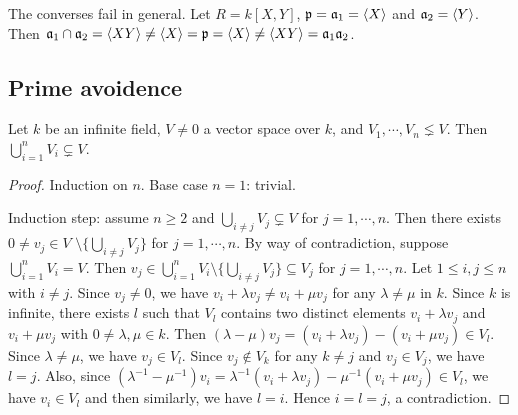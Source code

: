 \begin{example*}
    The converses fail in general. Let $R = k[X,Y]$, $\mathfrak{p} = \mathfrak{a}_1 = \langle X \rangle$ and $\mathfrak{a}_2 = \langle Y \rangle$. Then $\mathfrak{a}_1 \cap \mathfrak{a}_2 = \langle XY \rangle \neq \langle X \rangle = \mathfrak{p} = \langle X \rangle \neq  \langle XY \rangle = \mathfrak{a}_1\mathfrak{a}_2$.
\end{example*}

\subsection*{Prime avoidence}

\begin{lemma}
    Let $k$ be an infinite field, $V \neq 0$ a vector space over $k$, and $V_1,\cdots,V_n \lneq V$. Then $\bigcup_{i=1}^n V_i \subsetneq V$.
\end{lemma}

\begin{proof}
    Induction on $n$. Base case $n = 1$: trivial. \par
    Induction step: assume $n \geq 2$ and $\bigcup_{i \neq j}V_j \subsetneq V$ for $j = 1,\cdots,n$. Then there exists $0 \neq v_j \in V$ $\setminus \{\bigcup_{i \neq j}V_j\}$ for $j = 1,\cdots,n$. By way of contradiction, suppose $\bigcup_{i=1}^nV_i = V$. Then $v_j \in \bigcup_{i=1}^n V_i \setminus \{\bigcup_{i \neq j}V_j\} \subseteq V_j$ for $j = 1,\cdots,n$. Let $1 \leq i,j \leq n$ with $i \neq j$. Since $v_j \neq 0$, we have $v_i + \lambda v_j \neq v_i + \mu v_j$ for any $\lambda \neq \mu$ in $k$. Since $k$ is infinite, there exists $l$ such that $V_l$ contains two distinct elements $v_i + \lambda v_j$ and $v_i + \mu v_j$ with $0 \neq \lambda, \mu \in k$. Then $(\lambda-\mu)v_j = (v_i + \lambda v_j) - (v_i + \mu v_j) \in V_l$. Since $\lambda \neq \mu$, we have $v_j \in V_l$. Since $v_j \not \in V_k$ for any $k \neq j$ and $v_j \in V_j$, we have $l = j$. Also, since $(\lambda^{-1}-\mu^{-1})v_i = \lambda^{-1}(v_i + \lambda v_j) - \mu^{-1}(v_i + \mu v_j) \in V_l$, we have $v_i \in V_l$ and then similarly, we have $l=i$. Hence $i = l = j$, a contradiction.
\end{proof}

